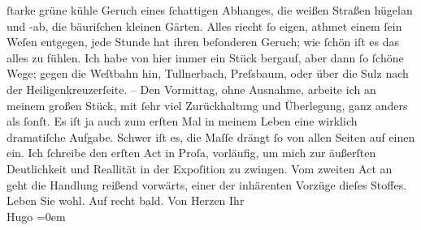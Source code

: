 \begin{ledgroupsized}[t]{13cm}
               ſtarke grüne kühle Geruch eines ſchattigen Abhanges, die weißen Straßen hügelan und
               -ab, die bäuriſchen kleinen Gärten. Alles riecht ſo eigen, athmet einem ſein {\pb}Weſen entgegen, jede Stunde hat
               ihren beſonderen Geruch; wie ſchön iſt es das alles zu fühlen.\pend
           \pstart
           Ich habe von hier immer ein Stück bergauf, aber dann ſo ſchöne Wege; gegen die Weſtbahn hin, Tullnerbach, Preſsbaum, oder über die Sulz nach der Heiligenkreuzerſeite.\pend
           \pstart
           \numberlinefalse{}–\numberlinetrue{}\pend
           \pstart
           Den Vormittag, ohne Ausnahme, arbeite ich an meinem großen Stück, mit ſehr viel Zurückhaltung und
               Überlegung, ganz anders als ſonſt. Es iſt {\pb}ja auch zum erſten Mal in meinem
               Leben eine wirklich dramatiſche Aufgabe. Schwer iſt es, die Maſſe drängt ſo von allen
               Seiten auf einen ein. Ich ſchreibe den erſten Act in Proſa, vorläufig, um mich zur
               äußerſten Deutlichkeit und Reallität in der Expoſition zu zwingen.\pend
           \pstart
           Vom zweiten Act an geht die Handlung reißend vorwärts, einer der inhärenten Vorzüge
               dieſes Stoffes.\pend
           \pstart
           Leben Sie wohl. Auf recht bald.\pend
           \pstart
           Von Herzen Ihr{\\[\baselineskip]}\spacefill\mbox{Hugo}\pend
           \leftskip=0em{}\endnumbering{}\end{ledgroupsized}  \newcommand{\dateiname}{L01161}\newcommand{\titel}{Hugo von Hofmannsthal an Arthur Schnitzler, 12. 8. [1901]}\newcommand{\editorInnen}{Martin Anton Müller und Gerd-Hermann Susen}
      